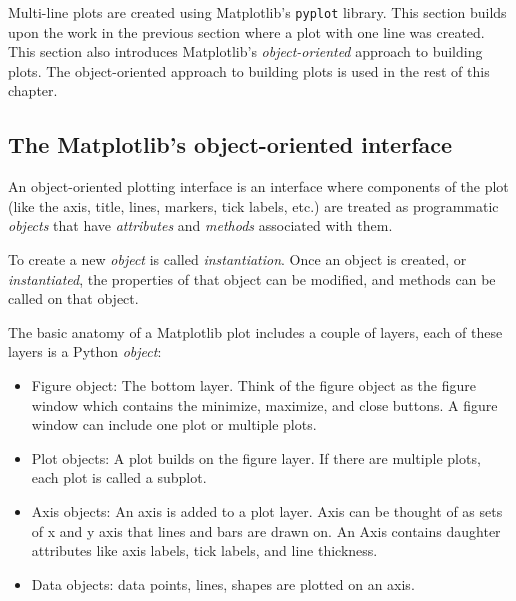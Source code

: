 \documentclass{book}
\providecommand{\tightlist}{%
      \setlength{\itemsep}{0pt}\setlength{\parskip}{0pt}}
\newcommand{\passthrough}[1]{#1}
\begin{document}
    
        Multi-line plots are created using Matplotlib's
\passthrough{\lstinline!pyplot!} library. This section builds upon the
work in the previous section where a plot with one line was created.
This section also introduces Matplotlib's \emph{object-oriented}
approach to building plots. The object-oriented approach to building
plots is used in the rest of this chapter.
    




    
        \hypertarget{the-matplotlibs-object-oriented-interface}{%
\subsection{The Matplotlib's object-oriented
interface}\label{the-matplotlibs-object-oriented-interface}}

An object-oriented plotting interface is an interface where components
of the plot (like the axis, title, lines, markers, tick labels, etc.)
are treated as programmatic \emph{objects} that have \emph{attributes}
and \emph{methods} associated with them.

To create a new \emph{object} is called \emph{instantiation}. Once an
object is created, or \emph{instantiated}, the properties of that object
can be modified, and methods can be called on that object.

The basic anatomy of a Matplotlib plot includes a couple of layers, each
of these layers is a Python \emph{object}:

\begin{itemize}
\tightlist
\item
  Figure object: The bottom layer. Think of the figure object as the
  figure window which contains the minimize, maximize, and close
  buttons. A figure window can include one plot or multiple plots.
\item
  Plot objects: A plot builds on the figure layer. If there are multiple
  plots, each plot is called a subplot.
\item
  Axis objects: An axis is added to a plot layer. Axis can be thought of
  as sets of x and y axis that lines and bars are drawn on. An Axis
  contains daughter attributes like axis labels, tick labels, and line
  thickness.
\item
  Data objects: data points, lines, shapes are plotted on an axis.
\end{itemize}
    
\end{document}
